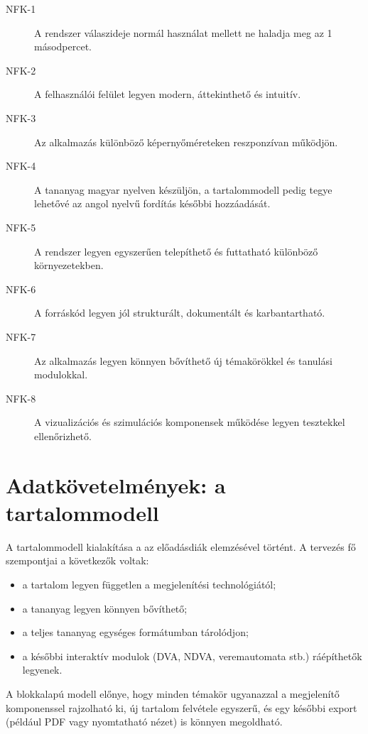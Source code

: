 \documentclass[12pt,a4paper]{report}
\begin{document}
\begin{description}
    \item[NFK-1] A rendszer válaszideje normál használat mellett ne
          haladja meg az 1 másodpercet.
    \item[NFK-2] A felhasználói felület legyen modern, áttekinthető és
          intuitív.
    \item[NFK-3] Az alkalmazás különböző képernyőméreteken reszponzívan
          működjön.
    \item[NFK-4] A tananyag magyar nyelven készüljön, a tartalommodell
          pedig tegye lehetővé az angol nyelvű fordítás későbbi
          hozzáadását.
    \item[NFK-5] A rendszer legyen egyszerűen telepíthető és futtatható
          különböző környezetekben.
    \item[NFK-6] A forráskód legyen jól strukturált, dokumentált és
          karbantartható.
    \item[NFK-7] Az alkalmazás legyen könnyen bővíthető új témakörökkel és
          tanulási modulokkal.
    \item[NFK-8] A vizualizációs és szimulációs komponensek működése
          legyen tesztekkel ellenőrizhető.
\end{description}

\section{Adatkövetelmények: a tartalommodell}
\label{sec:data}

A tartalommodell kialakítása a az előadásdiák elemzésével történt.
 A tervezés fő szempontjai a következők voltak:

\begin{itemize}
    \item a tartalom legyen független a megjelenítési technológiától;
    \item a tananyag legyen könnyen bővíthető;
    \item a teljes tananyag egységes formátumban tárolódjon;
    \item a későbbi interaktív modulok (DVA, NDVA, veremautomata stb.)
          ráépíthetők legyenek.
\end{itemize}

A blokkalapú modell előnye, hogy minden témakör ugyanazzal a
megjelenítő komponenssel rajzolható ki, új tartalom felvétele egyszerű,
és egy későbbi export (például PDF vagy nyomtatható nézet) is könnyen
megoldható.
\end{document}
